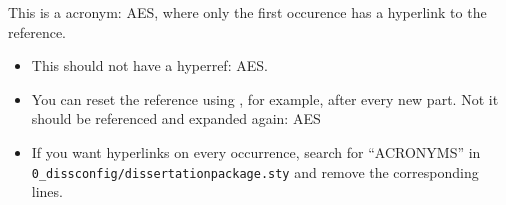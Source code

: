 This is a acronym: \gls{AES}, where only the first occurence has a hyperlink to the reference. 
\begin{itemize}
	\item This should not have a hyperref: \gls{AES}. 
	\item You can reset the reference using \detokenize{\glsresetall}, for example, after every new part. 
\glsresetall{} 
Not it should be referenced and expanded again: \gls{AES} 
	\item If you want hyperlinks on every occurrence, search for ``ACRONYMS'' in \lstinline{0_dissconfig/dissertationpackage.sty} and remove the corresponding lines. 
\end{itemize}







